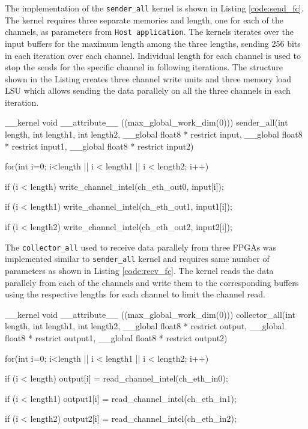 The implementation of the \texttt{sender\_all} kernel is shown in Listing \ref{code:send_fc}.
The kernel requires three separate memories and length, one for each of the channels, as
parameters from \texttt{Host application}. The kernels iterates over the input buffers for the maximum length
among the three lengths, sending 256 bits in each iteration over each channel. Individual
length for each channel is used to stop the sends for the specific channel in following
iterations. The structure shown in the Listing creates three channel write units and three
memory load \ac{LSU} which allows sending the data parallely on all the three channels
in each iteration.

\begin{CppCode} [caption=Sender Kernel for \texttt{fully connected}, frame=tlrb, label=code:send_fc, float]
__kernel void __attribute__ ((max_global_work_dim(0)))
sender_all(int length, int length1, int length2,
            __global float8 * restrict input,
            __global float8 * restrict input1,
            __global float8 * restrict input2)
{
    for(int i=0; i<length || i < length1 || i < length2; i++)
    {
        if (i < length)
            write_channel_intel(ch_eth_out0, input[i]);

        if (i < length1)
            write_channel_intel(ch_eth_out1, input1[i]);

        if (i < length2)
            write_channel_intel(ch_eth_out2, input2[i]);
    }
}
\end{CppCode}

The \texttt{collector\_all} used to receive data parallely from three FPGAs
was implemented similar to \texttt{sender\_all} kernel and requires same
number of parameters as shown in Listing \ref{code:recv_fc}. The kernel
reads the data parallely from each of the channels and write them to the
corresponding buffers using the respective lengths for each channel
to limit the channel read.

\begin{CppCode} [caption=Collector Kernel for \texttt{fully connected}, frame=tlrb, label=code:recv_fc, float]
__kernel void __attribute__ ((max_global_work_dim(0)))
collector_all(int length, int length1, int length2,
            __global float8 * restrict output,
            __global float8 * restrict output1,
            __global float8 * restrict output2)
{
    for(int i=0; i<length || i < length1 || i < length2; i++)
    {
        if (i < length)
            output[i] = read_channel_intel(ch_eth_in0);

        if (i < length1)
            output1[i] = read_channel_intel(ch_eth_in1);

        if (i < length2)
            output2[i] = read_channel_intel(ch_eth_in2);
    }
}
\end{CppCode}

